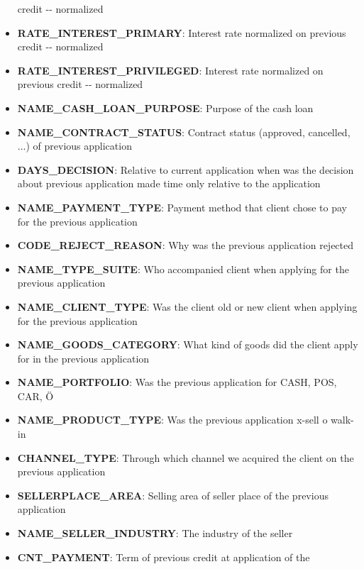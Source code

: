 \documentclass[11pt]{article}
\begin{document}
\begin{itemize}
  credit -\/- normalized
\item
  \textbf{RATE\_INTEREST\_PRIMARY}: Interest rate normalized on previous
  credit -\/- normalized
\item
  \textbf{RATE\_INTEREST\_PRIVILEGED}: Interest rate normalized on
  previous credit -\/- normalized
\item
  \textbf{NAME\_CASH\_LOAN\_PURPOSE}: Purpose of the cash loan\\
\item
  \textbf{NAME\_CONTRACT\_STATUS}: Contract status (approved, cancelled,
  ...) of previous application\\
\item
  \textbf{DAYS\_DECISION}: Relative to current application when was the
  decision about previous application made time only relative to the
  application
\item
  \textbf{NAME\_PAYMENT\_TYPE}: Payment method that client chose to pay
  for the previous application\\
\item
  \textbf{CODE\_REJECT\_REASON}: Why was the previous application
  rejected
\item
  \textbf{NAME\_TYPE\_SUITE}: Who accompanied client when applying for
  the previous application\\
\item
  \textbf{NAME\_CLIENT\_TYPE}: Was the client old or new client when
  applying for the previous application
\item
  \textbf{NAME\_GOODS\_CATEGORY}: What kind of goods did the client
  apply for in the previous application\\
\item
  \textbf{NAME\_PORTFOLIO}: Was the previous application for CASH, POS,
  CAR, Ö
\item
  \textbf{NAME\_PRODUCT\_TYPE}: Was the previous application x-sell o
  walk-in\\
\item
  \textbf{CHANNEL\_TYPE}: Through which channel we acquired the client
  on the previous application\\
\item
  \textbf{SELLERPLACE\_AREA}: Selling area of seller place of the
  previous application\\
\item
  \textbf{NAME\_SELLER\_INDUSTRY}: The industry of the seller\\
\item
  \textbf{CNT\_PAYMENT}: Term of previous credit at application of the

\end{itemize}
\end{document}
